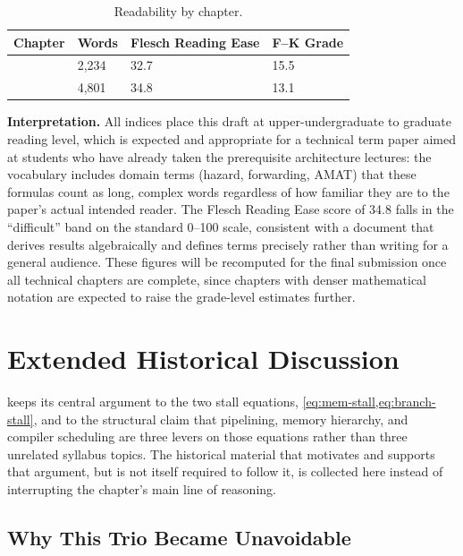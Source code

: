\documentclass[12pt,a4paper]{report}
\begin{document}
\begin{table}[htbp]
\centering
\caption{Readability by chapter.}
\label{tab:readability-breakdown}
\begin{tabular}{@{}L{0.32\textwidth}L{0.14\textwidth}L{0.24\textwidth}L{0.14\textwidth}@{}}
\toprule
\textbf{Chapter} & \textbf{Words} & \textbf{Flesch Reading Ease} & \textbf{F--K Grade} \\
\midrule
{} & 2{,}234 & 32.7 & 15.5 \\
 & 4{,}801 & 34.8 & 13.1 \\
\bottomrule
\end{tabular}
\end{table}

\noindent\textbf{Interpretation.} All indices place this draft at
upper-undergraduate to graduate reading level, which is expected and
appropriate for a technical term paper aimed at students who have
already taken the prerequisite architecture lectures: the vocabulary
includes domain terms (hazard, forwarding, AMAT) that these formulas
count as long, complex words regardless of how familiar they are to the
paper's actual intended reader. The Flesch Reading Ease score of 34.8
falls in the ``difficult'' band on the standard 0--100 scale, consistent
with a document that derives results algebraically and defines terms
precisely rather than writing for a general audience. These figures will
be recomputed for the final submission once all technical chapters are
complete, since chapters with denser mathematical notation are expected
to raise the grade-level estimates further.

\chapter{Extended Historical Discussion}
\label{app:history}

 keeps its central argument to the two stall equations,
\cref{eq:mem-stall,eq:branch-stall}, and to the structural claim that
pipelining, memory hierarchy, and compiler scheduling are three levers
on those equations rather than three unrelated syllabus topics. The
historical material that motivates and supports that argument, but is
not itself required to follow it, is collected here instead of
interrupting the chapter's main line of reasoning.

\section{Why This Trio Became Unavoidable}
\label{app:history-trio}
\end{document}
